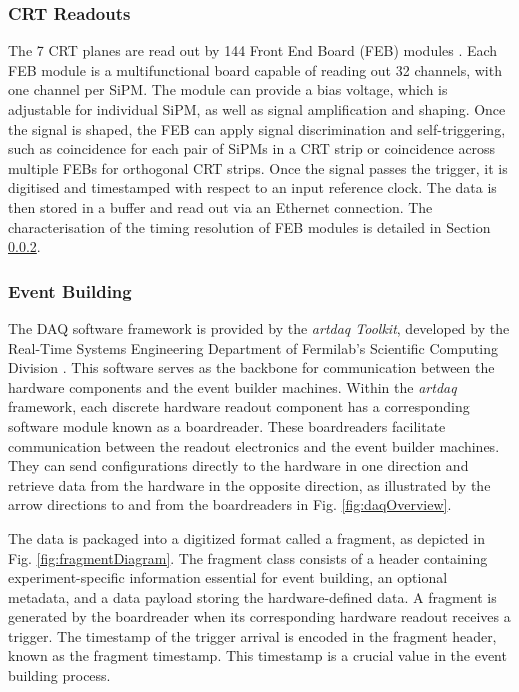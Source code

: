 \subsubsection{CRT Readouts}
The 7 CRT planes are read out by 144 Front End Board (FEB) modules \cite{crt_note}. 
Each FEB module is a multifunctional board capable of reading out 32 channels, with one channel per SiPM. 
The module can provide a bias voltage, which is adjustable for individual SiPM, as well as signal amplification and shaping.
Once the signal is shaped, the FEB can apply signal discrimination and self-triggering, such as coincidence for each pair of SiPMs in a CRT strip or coincidence across multiple FEBs for orthogonal CRT strips. 
Once the signal passes the trigger, it is digitised and timestamped with respect to an input reference clock. 
The data is then stored in a buffer and read out via an Ethernet connection. 
The characterisation of the timing resolution of FEB modules is detailed in Section \ref{}.

\subsubsection{Event Building}

The DAQ software framework is provided by the \textit{artdaq Toolkit}, developed by the Real-Time Systems Engineering Department of Fermilab's Scientific Computing Division \cite{artdaq_note}. 
This software serves as the backbone for communication between the hardware components and the event builder machines.
Within the \textit{artdaq} framework, each discrete hardware readout component has a corresponding software module known as a boardreader. 
These boardreaders facilitate communication between the readout electronics and the event builder machines. 
They can send configurations directly to the hardware in one direction and retrieve data from the hardware in the opposite direction, as illustrated by the arrow directions to and from the boardreaders in Fig. \ref{fig:daqOverview}.

The data is packaged into a digitized format called a fragment, as depicted in Fig. \ref{fig:fragmentDiagram}. 
The fragment class consists of a header containing experiment-specific information essential for event building, an optional metadata, and a data payload storing the hardware-defined data.
A fragment is generated by the boardreader when its corresponding hardware readout receives a trigger. 
The timestamp of the trigger arrival is encoded in the fragment header, known as the fragment timestamp. 
This timestamp is a crucial value in the event building process.

